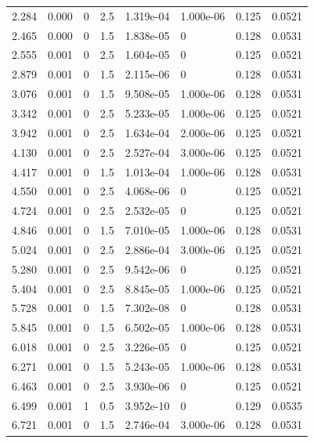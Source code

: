 \documentclass[preview]{standalone}
\begin{document}
{{\begin{tabular}{L{1.2cm}C{1.2cm} C{0.3cm}C{0.5cm} C{1.4cm}C{1.4cm} C{1.4cm}C{1.4cm}}
  2.284  &  0.000  & 0     & 2.5 &  1.319e-04  & 1.000e-06  & 0.125 &  0.0521   \\ 
  2.465  &  0.000  & 0     & 1.5 &  1.838e-05  & 0  & 0.128 &  0.0531   \\ 
  2.555  &  0.001  & 0     & 2.5 &  1.604e-05  & 0  & 0.125 &  0.0521   \\ 
  2.879  &  0.001  & 0     & 1.5 &  2.115e-06  & 0  & 0.128 &  0.0531   \\ 
  3.076  &  0.001  & 0     & 1.5 &  9.508e-05  & 1.000e-06  & 0.128 &  0.0531   \\ 
  3.342  &  0.001  & 0     & 2.5 &  5.233e-05  & 1.000e-06  & 0.125 &  0.0521   \\ 
  3.942  &  0.001  & 0     & 2.5 &  1.634e-04  & 2.000e-06  & 0.125 &  0.0521   \\ 
  4.130  &  0.001  & 0     & 2.5 &  2.527e-04  & 3.000e-06  & 0.125 &  0.0521   \\ 
  4.417  &  0.001  & 0     & 1.5 &  1.013e-04  & 1.000e-06  & 0.128 &  0.0531   \\ 
  4.550  &  0.001  & 0     & 2.5 &  4.068e-06  & 0  & 0.125 &  0.0521   \\ 
  4.724  &  0.001  & 0     & 2.5 &  2.532e-05  & 0  & 0.125 &  0.0521   \\ 
  4.846  &  0.001  & 0     & 1.5 &  7.010e-05  & 1.000e-06  & 0.128 &  0.0531   \\ 
  5.024  &  0.001  & 0     & 2.5 &  2.886e-04  & 3.000e-06  & 0.125 &  0.0521   \\ 
  5.280  &  0.001  & 0     & 2.5 &  9.542e-06  & 0  & 0.125 &  0.0521   \\ 
  5.404  &  0.001  & 0     & 2.5 &  8.845e-05  & 1.000e-06  & 0.125 &  0.0521   \\ 
  5.728  &  0.001  & 0     & 1.5 &  7.302e-08  & 0  & 0.128 &  0.0531   \\ 
  5.845  &  0.001  & 0     & 1.5 &  6.502e-05  & 1.000e-06  & 0.128 &  0.0531   \\ 
  6.018  &  0.001  & 0     & 2.5 &  3.226e-05  & 0  & 0.125 &  0.0521   \\ 
  6.271  &  0.001  & 0     & 1.5 &  5.243e-05  & 1.000e-06  & 0.128 &  0.0531   \\ 
  6.463  &  0.001  & 0     & 2.5 &  3.930e-06  & 0  & 0.125 &  0.0521   \\ 
  6.499  &  0.001  & 1     & 0.5 &  3.952e-10  & 0  & 0.129 &  0.0535   \\ 
  6.721  &  0.001  & 0     & 1.5 &  2.746e-04  & 3.000e-06  & 0.128 &  0.0531   \\ 

\end{tabular}}}
\end{document}
